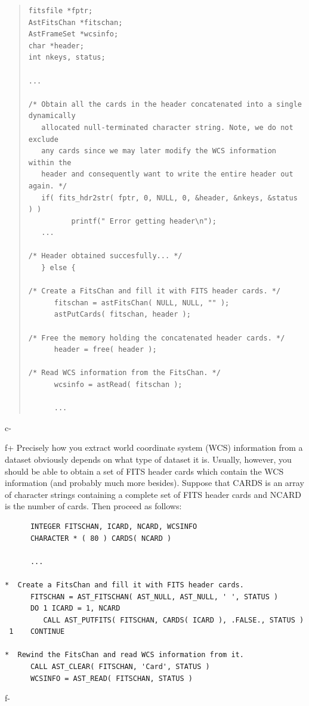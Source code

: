 \documentclass[twoside,11pt]{article}
\begin{document}
\begin{quote}
\small
\begin{verbatim}
fitsfile *fptr;
AstFitsChan *fitschan;
AstFrameSet *wcsinfo;
char *header;
int nkeys, status;

...

/* Obtain all the cards in the header concatenated into a single dynamically
   allocated null-terminated character string. Note, we do not exclude
   any cards since we may later modify the WCS information within the
   header and consequently want to write the entire header out again. */
   if( fits_hdr2str( fptr, 0, NULL, 0, &header, &nkeys, &status ) )
          printf(" Error getting header\n");
   ...

/* Header obtained succesfully... */
   } else {

/* Create a FitsChan and fill it with FITS header cards. */
      fitschan = astFitsChan( NULL, NULL, "" );
      astPutCards( fitschan, header );

/* Free the memory holding the concatenated header cards. */
      header = free( header );

/* Read WCS information from the FitsChan. */
      wcsinfo = astRead( fitschan );

      ...

\end{verbatim}
\normalsize
\end{quote}
c-

f+
Precisely how you extract world coordinate system (WCS) information
from a dataset obviously depends on what type of dataset it
is. Usually, however, you should be able to obtain a set of FITS
header cards which contain the WCS information (and probably much more
besides). Suppose that CARDS is an array of character strings
containing a complete set of FITS header cards and NCARD is the number
of cards. Then proceed as follows:

\small
\begin{verbatim}
      INTEGER FITSCHAN, ICARD, NCARD, WCSINFO
      CHARACTER * ( 80 ) CARDS( NCARD )

      ...

*  Create a FitsChan and fill it with FITS header cards.
      FITSCHAN = AST_FITSCHAN( AST_NULL, AST_NULL, ' ', STATUS )
      DO 1 ICARD = 1, NCARD
         CALL AST_PUTFITS( FITSCHAN, CARDS( ICARD ), .FALSE., STATUS )
 1    CONTINUE

*  Rewind the FitsChan and read WCS information from it.
      CALL AST_CLEAR( FITSCHAN, 'Card', STATUS )
      WCSINFO = AST_READ( FITSCHAN, STATUS )
\end{verbatim}
\normalsize
f-
\end{document}
